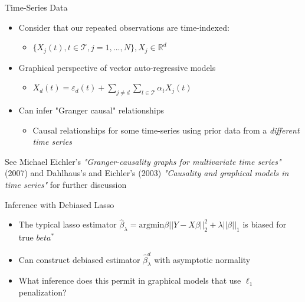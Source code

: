 \documentclass{beamer}
\begin{document}
\begin{frame}{Time-Series Data}

\begin{itemize} \setlength\itemsep{5mm}

    \item Consider that our repeated observations are time-indexed:
    \begin{itemize} 
        \item  $\{X_j(t), t \in \mathcal{T}, j=1, ..., N\}, X_j \in \mathbb{R}^d$ 
    \end{itemize}

    \item Graphical perspective of vector auto-regressive models
    \begin{itemize}
        \item $X_d(t) = \varepsilon_d(t) + \sum_{j\neq d}\sum_{t\in\mathcal{T}} \alpha_tX_j(t)$
    \end{itemize}


    \item Can infer "Granger causal" relationships
        \begin{itemize}
            \item Causal relationships for some time-series using prior data from a {\it different time series}
        \end{itemize}

\end{itemize}

See Michael Eichler's {\it "Granger-causality graphs for multivariate time series"} (2007) and Dahlhaus's and Eichler's (2003) {\it "Causality and graphical models in time series"} for further discussion  

\end{frame}


\begin{frame}{Inference with Debiased Lasso}
    \begin{itemize}
    \item The typical lasso estimator $\hat\beta_\lambda = \text{argmin}\beta ||Y-X\beta||_2^2 + \lambda||\beta||_1$ is biased for true $beta^*$
    \item Can construct debiased estimator $\hat\beta_\lambda^d$ with asymptotic normality 
    \item What inference does this permit in graphical models that use $\ell_1$ penalization? 
    \end{itemize}
\end{frame}
\end{document}
